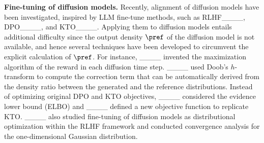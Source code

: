 \vspace{-1mm}
\textbf{Fine-tuning of diffusion models.}\quad
Recently, alignment of diffusion models have been investigated, inspired by LLM fine-tune methods, such as RLHF____, DPO____, and KTO____. Applying them to diffusion models entails additional difficulty since the output density $\pref$ of the diffusion model is not available, and hence several techniques have been developed to circumvent the explicit calculation of $\pref$. 
For instance, ____ invented the maximization algorithm of the reward in each diffusion time step. ____ used Doob's $h$-transform to compute the correction term that can be automatically derived from the density ratio between the generated and the reference distributions. Instead of optimizing original DPO and KTO objectives, ____ considered the evidence lower bound (ELBO) and ____ defined a new objective function to replicate KTO.
\revisedStart
____ also studied fine-tuning of diffusion models as distributional optimization within the RLHF framework and conducted convergence analysis for the one-dimensional Gaussian distribution.\revisedEnd








